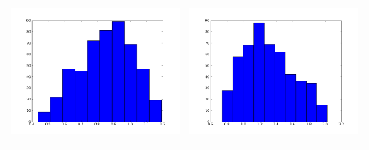 \documentclass[12pt,a4paper,titlepage]{article}
\begin{document}
\begin{table}[ht]
\begin{tabular}{cc}
\includegraphics[scale=0.2]{p4th1_1}&\includegraphics[scale=0.2]{p4th2_1.png}\\
\newline

\end{tabular}
\end{table}
\end{document}
